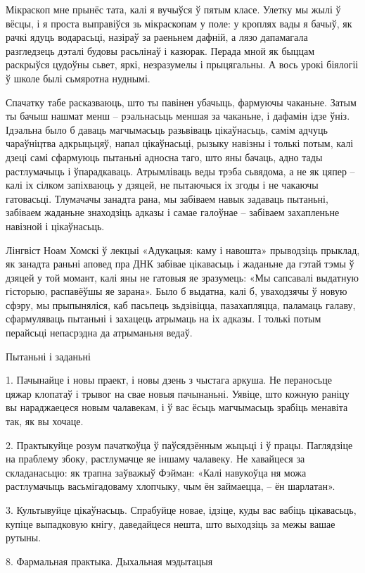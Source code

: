 Мікраскоп мне прынёс тата, калі я вучыўся ў пятым класе. Улетку мы жылі ў вёсцы, і я проста выправіўся зь мікраскопам у поле: у кроплях вады я бачыў, як рачкі ядуць водарасьці, назіраў за раеньнем дафній, а лязо дапамагала разгледзець дэталі будовы расьлінаў і казюрак. Перада мной як быццам раскрыўся цудоўны сьвет, яркі, незразумелы і прыцягальны. А вось урокі біялогіі ў школе былі сьмяротна нуднымі.

Спачатку табе расказваюць, што ты павінен убачыць, фармуючы чаканьне. Затым ты бачыш нашмат менш – рэальнасьць меншая за чаканьне, і дафамін ідзе ўніз. Ідэальна было б даваць магчымасьць разьвіваць цікаўнасьць, самім адчуць чараўніцтва адкрыцьцяў, напал цікаўнасьці, рызыку навізны і толькі потым, калі дзеці самі сфармуюць пытаньні адносна таго, што яны бачаць, адно тады растлумачыць і ўпарадкаваць. Атрымліваць веды трэба сьвядома, а не як цяпер – калі іх сілком запіхваюць у дзяцей, не пытаючыся іх згоды і не чакаючы гатовасьці. Тлумачачы занадта рана, мы забіваем навык задаваць пытаньні, забіваем жаданьне знаходзіць адказы і самае галоўнае – забіваем захапленьне навізной і цікаўнасьць.

Лінгвіст Ноам Хомскі ў лекцыі «Адукацыя: каму і навошта» прыводзіць прыклад, як занадта раньні аповед пра ДНК забівае цікавасьць і жаданьне да гэтай тэмы ў дзяцей у той момант, калі яны не гатовыя яе зразумець: «Мы сапсавалі выдатную гісторыю, распавёўшы яе зарана». Было б выдатна, калі б, уваходзячы ў новую сфэру, мы прыпыняліся, каб пасьпець зьдзівіцца, пазахапляцца, паламаць галаву, сфармуляваць пытаньні і захацець атрымаць на іх адказы. І толькі потым перайсьці непасрэдна да атрыманьня ведаў.

Пытаньні і заданьні

1. Пачынайце і новы праект, і новы дзень з чыстага аркуша. Не пераносьце цяжар клопатаў і трывог на свае новыя пачынаньні. Уявіце, што кожную раніцу вы нараджаецеся новым чалавекам, і ў вас ёсьць магчымасьць зрабіць менавіта так, як вы хочаце.

2. Практыкуйце розум пачаткоўца ў паўсядзённым жыцьці і ў працы. Паглядзіце на праблему збоку, растлумачце яе іншаму чалавеку. Не хавайцеся за складанасьцю: як трапна заўважыў Фэйман: «Калі навукоўца ня можа растлумачыць васьмігадоваму хлопчыку, чым ён займаецца, – ён шарлатан».

3. Культывуйце цікаўнасьць. Спрабуйце новае, ідзіце, куды вас вабіць цікавасьць, купіце выпадковую кнігу, даведайцеся нешта, што выходзіць за межы вашае рутыны.


8. Фармальная практыка. Дыхальная мэдытацыя

